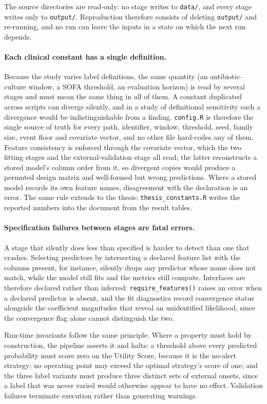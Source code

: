 The source directories are read-only: no stage writes to \texttt{data/}, and
every stage writes only to \texttt{output/}. Reproduction therefore consists of
deleting \texttt{output/} and re-running, and no run can leave the inputs in a
state on which the next run depends.

\paragraph{Each clinical constant has a single definition.}
Because the study varies label definitions, the same quantity (an
antibiotic--culture window, a SOFA threshold, an evaluation horizon) is read by
several stages and must mean the same thing in all of them. A constant
duplicated across scripts can diverge silently, and in a study of definitional
sensitivity such a divergence would be indistinguishable from a finding.
\texttt{config.R} is therefore the single source of truth for every path,
identifier, window, threshold, seed, family size, event floor and covariate
vector, and no other file hard-codes any of them. Feature consistency is
enforced through the covariate vector, which the two fitting stages and the
external-validation stage all read; the latter reconstructs a stored model's
column order from it, so divergent copies would produce a permuted design
matrix and well-formed but wrong predictions. Where a stored model records its
own feature names, disagreement with the declaration is an error. The same rule
extends to the thesis: \texttt{thesis\_constants.R} writes the reported numbers
into the document from the result tables.

\paragraph{Specification failures between stages are fatal errors.}
A stage that silently does less than specified is harder to detect than one
that crashes. Selecting predictors by intersecting a declared feature list with
the columns present, for instance, silently drops any predictor whose name does
not match, while the model still fits and the metrics still compute. Interfaces
are therefore declared rather than inferred: \texttt{require\_features()} raises
an error when a declared predictor is absent, and the fit diagnostics record
convergence status alongside the coefficient magnitudes that reveal an
unidentified likelihood, since the convergence flag alone cannot distinguish
the two.

Run-time invariants follow the same principle. Where a property must hold by
construction, the pipeline asserts it and halts: a threshold above every
predicted probability must score zero on the Utility Score, because it is the
no-alert strategy; no operating point may exceed the optimal strategy's score
of one; and the three label variants must produce three distinct sets of
external onsets, since a label that was never varied would otherwise appear to
have no effect. Validation failures terminate execution rather than generating
warnings.

